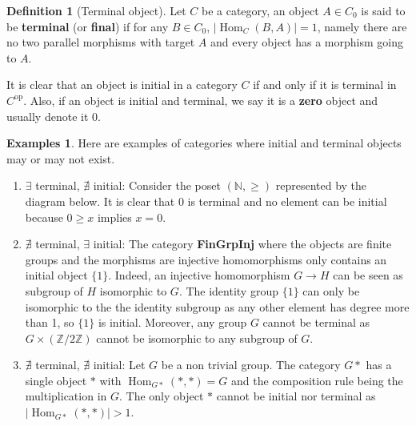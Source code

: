\documentclass{article}
\theoremstyle{definition}
\newtheorem{defn}[thm]{Definition}
\newtheorem{exmps}[thm]{Examples}
\theoremstyle{remark}
\newcommand{\N}{\mathbb{N}}
\newcommand{\Z}{\mathbb{Z}}
\DeclareMathOperator{\Hom}{Hom}
\newcommand{\op}[1]{#1^{\text{op}}}
\begin{document}
\begin{defn}[Terminal object]
	Let $C$ be a category, an object $A \in C_0$ is said to be \textbf{terminal} (or \textbf{final}) if for any $B \in C_0$, $|\Hom_C(B,A)| = 1$, namely there are no two parallel morphisms with target $A$ and every object has a morphism going to $A$.
\end{defn}
It is clear that an object is initial in a category $C$ if and only if it is terminal in $\op{C}$. Also, if an object is initial and terminal, we say it is a \textbf{zero} object and usually denote it $0$.
\begin{exmps}
	Here are examples of categories where initial and terminal objects may or may not exist.
	\begin{enumerate}
		\item $\exists$ terminal, $\nexists$ initial: Consider the poset $(\N, \geq)$ represented by the diagram below. It is clear that $0$ is terminal and no element can be initial because $0 \geq x$ implies $x = 0$.
		\begin{figure}[h]
			\centering
		\end{figure}
		\item  $\nexists$ terminal, $\exists$ initial: The category \textbf{FinGrpInj} where the objects are finite groups and the morphisms are injective homomorphisms only contains an initial object $\{1\}$. Indeed, an injective homomorphism $G \rightarrow H$ can be seen as subgroup of $H$ isomorphic to $G$. The identity group $\{1\}$ can only be isomorphic to the the identity subgroup as any other element has degree more than 1, so $\{1\}$ is initial. Moreover, any group $G$ cannot be terminal as $G \times (\Z/2\Z)$ cannot be isomorphic to any subgroup of $G$.
		\item $\nexists$ terminal, $\nexists$ initial: Let $G$ be a non trivial group. The category $G*$ has a single object $*$ with $\Hom_{G*}(*, *) = G$ and the composition rule being the multiplication in $G$. The only object $*$ cannot be initial nor terminal as $|\Hom_{G*}(*,*)| > 1$.
		

\end{enumerate}
\end{exmps}
\end{document}

